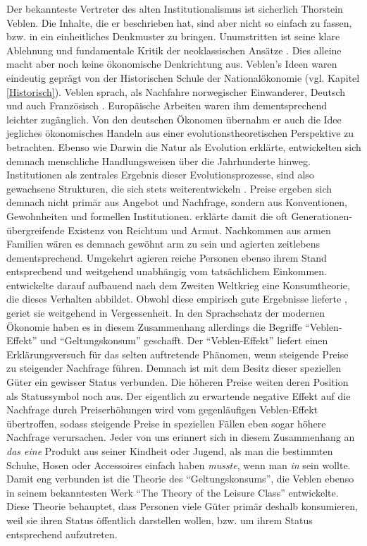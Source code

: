 Der bekannteste Vertreter des alten Institutionalismus ist sicherlich Thorstein Veblen. Die Inhalte, die er beschrieben hat, sind aber nicht so einfach zu fassen, bzw. in ein einheitliches Denkmuster zu bringen. Unumstritten ist seine klare Ablehnung und fundamentale Kritik der neoklassischen Ansätze \parencite[S. 703]{Blaug1962}. Dies alleine macht aber noch keine ökonomische Denkrichtung aus. Veblen's Ideen waren eindeutig geprägt von der Historischen Schule der Nationalökonomie (vgl. Kapitel \ref{Historisch}). Veblen sprach, als Nachfahre norwegischer Einwanderer, Deutsch und auch Französisch \parencite[S. 418]{Hodgson1998b}. Europäische Arbeiten waren ihm dementsprechend leichter zugänglich. Von den deutschen Ökonomen übernahm er auch die Idee jegliches ökonomisches Handeln aus einer evolutionstheoretischen Perspektive zu betrachten. Ebenso wie Darwin die Natur als Evolution erklärte, entwickelten sich demnach menschliche Handlungsweisen über die Jahrhunderte hinweg. Institutionen als zentrales Ergebnis dieser Evolutionsprozesse, sind also gewachsene Strukturen, die sich stets weiterentwickeln \parencite[S. 424]{Dugger1979}. Preise ergeben sich demnach nicht primär aus Angebot und Nachfrage, sondern aus Konventionen, Gewohnheiten und formellen Institutionen. \textcite{Veblen1899} erklärte damit die oft Generationen-übergreifende Existenz von Reichtum und Armut. Nachkommen aus armen Familien wären es demnach gewöhnt arm zu sein und agierten zeitlebens dementsprechend. Umgekehrt agieren reiche Personen ebenso ihrem Stand entsprechend und weitgehend unabhängig vom tatsächlichem Einkommen. \textcite{Duesenberry1949} entwickelte darauf aufbauend nach dem Zweiten Weltkrieg eine Konsumtheorie, die dieses Verhalten abbildet. Obwohl diese empirisch gute Ergebnisse lieferte \parencite[S. 170]{Hodgson1998}, geriet sie weitgehend in Vergessenheit. In den Sprachschatz der modernen Ökonomie haben es in diesem Zusammenhang allerdings die Begriffe "`Veblen-Effekt"' und "`Geltungskonsum"' geschafft. Der "`Veblen-Effekt"' liefert einen Erklärungsversuch für das selten auftretende Phänomen, wenn steigende Preise zu steigender Nachfrage führen. Demnach ist mit dem Besitz dieser speziellen Güter ein gewisser Status verbunden. Die höheren Preise weiten deren Position als Statussymbol noch aus. Der eigentlich zu erwartende negative Effekt auf die Nachfrage durch Preiserhöhungen wird vom gegenläufigen Veblen-Effekt übertroffen, sodass steigende Preise in speziellen Fällen eben sogar höhere Nachfrage verursachen. Jeder von uns erinnert sich in diesem Zusammenhang an \textit{das eine} Produkt aus seiner Kindheit oder Jugend, als man die bestimmten Schuhe, Hosen oder Accessoires einfach haben \textit{musste}, wenn man \textit{in} sein wollte. Damit eng verbunden ist die Theorie des "`Geltungskonsums"', die Veblen ebenso in seinem bekanntesten Werk "`The Theory of the Leisure Class"' \parencite{Veblen1899} entwickelte. Diese Theorie behauptet, dass Personen viele Güter primär deshalb konsumieren, weil sie ihren Status öffentlich darstellen wollen, bzw. um ihrem Status entsprechend aufzutreten. 

